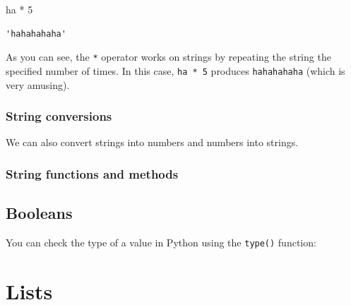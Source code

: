 \documentclass[
  letterpaper,
  DIV=11,
  numbers=noendperiod]{scrreprt}
\newenvironment{Shaded}{\begin{snugshade}}{\end{snugshade}}
\newcommand{\CommentTok}[1]{\textcolor[rgb]{0.37,0.37,0.37}{#1}}
\newcommand{\DecValTok}[1]{\textcolor[rgb]{0.68,0.00,0.00}{#1}}
\newcommand{\OperatorTok}[1]{\textcolor[rgb]{0.37,0.37,0.37}{#1}}
\begin{document}
\begin{tcolorbox}[enhanced jigsaw, toprule=.15mm, leftrule=.75mm, toptitle=1mm, title=\textcolor{quarto-callout-note-color}{\faInfo}\hspace{0.5em}{Solution}, left=2mm, coltitle=black, colframe=quarto-callout-note-color-frame, colback=white, breakable, opacityback=0, titlerule=0mm, bottomtitle=1mm, bottomrule=.15mm, arc=.35mm, colbacktitle=quarto-callout-note-color!10!white, rightrule=.15mm, opacitybacktitle=0.6]

\begin{Shaded}
\begin{Highlighting}[]
\CommentTok{\textquotesingle{}ha\textquotesingle{}} \OperatorTok{*} \DecValTok{5}
\end{Highlighting}
\end{Shaded}

\begin{verbatim}
'hahahahaha'
\end{verbatim}

As you can see, the \texttt{*} operator works on strings by repeating
the string the specified number of times. In this case,
\texttt{\textquotesingle{}ha\textquotesingle{}\ *\ 5} produces
\texttt{\textquotesingle{}hahahahaha\textquotesingle{}} (which is very
amusing).

\end{tcolorbox}

\subsubsection{String conversions}\label{string-conversions}

We can also convert strings into numbers and numbers into strings.

\subsubsection{String functions and
methods}\label{string-functions-and-methods}

\subsection{Booleans}\label{booleans}

You can check the type of a value in Python using the \texttt{type()}
function:

\section{Lists}\label{lists}
\end{document}
